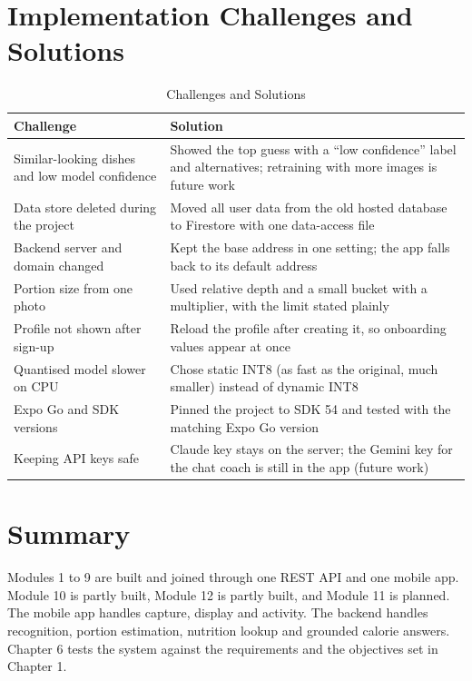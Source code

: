 \section{Implementation Challenges and Solutions}
\begin{table}[H]
\centering
\caption{Challenges and Solutions}
\label{tab:challenges}
\small
\begin{tabularx}{\textwidth}{|>{\raggedright\arraybackslash}p{4.4cm}|>{\raggedright\arraybackslash}X|}
\hline
\textbf{Challenge} & \textbf{Solution} \\ \hline
Similar-looking dishes and low model confidence & Showed the top guess with a ``low confidence'' label and alternatives; retraining with more images is future work \\ \hline
Data store deleted during the project & Moved all user data from the old hosted database to Firestore with one data-access file \\ \hline
Backend server and domain changed & Kept the base address in one setting; the app falls back to its default address \\ \hline
Portion size from one photo & Used relative depth and a small bucket with a multiplier, with the limit stated plainly \\ \hline
Profile not shown after sign-up & Reload the profile after creating it, so onboarding values appear at once \\ \hline
Quantised model slower on CPU & Chose static INT8 (as fast as the original, much smaller) instead of dynamic INT8 \\ \hline
Expo Go and SDK versions & Pinned the project to SDK 54 and tested with the matching Expo Go version \\ \hline
Keeping API keys safe & Claude key stays on the server; the Gemini key for the chat coach is still in the app (future work) \\ \hline
\end{tabularx}
\end{table}

\section{Summary}
Modules 1 to 9 are built and joined through one REST API and one mobile app. Module 10 is partly built, Module 12
is partly built, and Module 11 is planned. The mobile app handles capture, display and activity. The backend handles
recognition, portion estimation, nutrition lookup and grounded calorie answers. Chapter 6 tests the system against
the requirements and the objectives set in Chapter 1.
